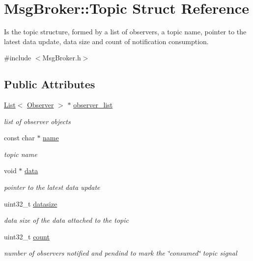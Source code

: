 \hypertarget{struct_msg_broker_1_1_topic}{\section{Msg\-Broker\-:\-:Topic Struct Reference}
\label{struct_msg_broker_1_1_topic}
}


Is the topic structure, formed by a list of observers, a topic name, pointer to the latest data update, data size and count of notification consumption.  




{\ttfamily \#include $<$Msg\-Broker.\-h$>$}

\subsection*{Public Attributes}
\begin{DoxyCompactItemize}
\item 
\hyperlink{class_list}{List}$<$ \hyperlink{struct_msg_broker_1_1_observer}{Observer} $>$ $\ast$ \hyperlink{struct_msg_broker_1_1_topic_a6109a82a783cc81a889a6ddef5af5ecc}{observer\-\_\-list}
\begin{DoxyCompactList}\small\item\em list of observer objects \end{DoxyCompactList}\item 
const char $\ast$ \hyperlink{struct_msg_broker_1_1_topic_a6cdd55155171ef025ab20f3a7c1b5091}{name}
\begin{DoxyCompactList}\small\item\em topic name \end{DoxyCompactList}\item 
void $\ast$ \hyperlink{struct_msg_broker_1_1_topic_ab3cecf94841562b7dcd62c36f3ee3be6}{data}
\begin{DoxyCompactList}\small\item\em pointer to the latest data update \end{DoxyCompactList}\item 
uint32\-\_\-t \hyperlink{struct_msg_broker_1_1_topic_a8cc287ab37bc41fd6b671eacdcf7393a}{datasize}
\begin{DoxyCompactList}\small\item\em data size of the data attached to the topic \end{DoxyCompactList}\item 
uint32\-\_\-t \hyperlink{struct_msg_broker_1_1_topic_a939161befbc15201a30852158dc22271}{count}
\begin{DoxyCompactList}\small\item\em number of observers notified and pendind to mark the \char`\"{}consumed\char`\"{} topic signal \end{DoxyCompactList}\end{DoxyCompactItemize}


